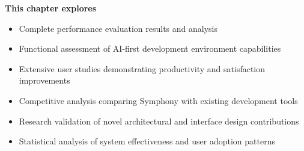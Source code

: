 \begin{tcolorbox}[
    enhanced,
    colback=white,
    colframe=brandPrimary!40,
    boxrule=1pt,
    arc=12pt,
    drop shadow={brandPrimary!20},
    left=1.5cm,
    right=1.5cm,
    top=1.2cm,
    bottom=1.2cm,
    before upper={\parindent0pt}
]
\begin{center}
{\Large\textbf{\textcolor{brandPrimary}{This chapter explores}}}
\end{center}

\vspace{0.8cm}

\begin{itemize}[leftmargin=1.2cm, itemsep=0.4cm, label={\textcolor{brandAccent}{$\triangleright$}}]
    \item {\large Complete performance evaluation results and analysis}
    \item {\large Functional assessment of AI-first development environment capabilities}
    \item {\large Extensive user studies demonstrating productivity and satisfaction improvements}
    \item {\large Competitive analysis comparing Symphony with existing development tools}
    \item {\large Research validation of novel architectural and interface design contributions}
    \item {\large Statistical analysis of system effectiveness and user adoption patterns}
\end{itemize}
\end{tcolorbox}

\clearpage
